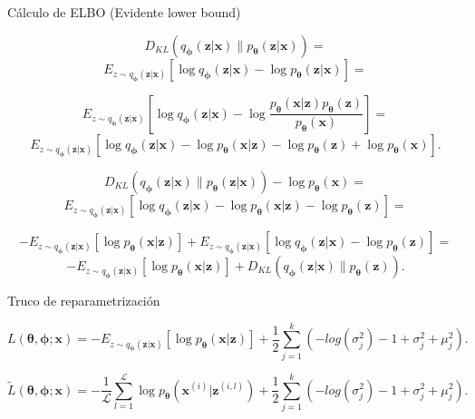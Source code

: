 \documentclass[spanish]{beamer}
\begin{document}
\begin{frame}{Cálculo de ELBO (Evidente lower bound)}

$$D_{KL}(q_{\boldsymbol{\phi}}(\textbf{z}|\textbf{x}) \parallel p_{\boldsymbol{\theta}}(\textbf{z}|\textbf{x})) =$$ $$ E_{z \sim q_{\boldsymbol{\phi}} (\textbf{z}|\textbf{x})} \left[ \log q_{\boldsymbol{\phi}}(\textbf{z}|\textbf{x}) - \log p_{\boldsymbol{\theta}}(\textbf{z}|\textbf{x}) \right] =$$

\pause
$$E_{z \sim q_{\boldsymbol{\phi}} (\textbf{z}|\textbf{x})} \left[ \log q_{\boldsymbol{\phi}}(\textbf{z}|\textbf{x}) - \log  \frac{p_{\boldsymbol{\theta}}(\textbf{x}|\textbf{z})p_{\boldsymbol{\theta}}(\textbf{z})}{p_{\boldsymbol{\theta}}(\textbf{x})}\right]=$$ $$ E_{z \sim q_{\boldsymbol{\phi}} (\textbf{z}|\textbf{x})} \left[ \log q_{\boldsymbol{\phi}}(\textbf{z}|\textbf{x}) - \log  p_{\boldsymbol{\theta}}(\textbf{x}|\textbf{z}) - \log p_{\boldsymbol{\theta}}(\textbf{z}) + \log p_{\boldsymbol{\theta}}(\textbf{x})\right].$$

\pause
$$ D_{KL}(q_{\boldsymbol{\phi}}(\textbf{z}|\textbf{x}) \parallel p_{\boldsymbol{\theta}}(\textbf{z}|\textbf{x})) - \log p_{\boldsymbol{\theta}}(\textbf{x}) =$$ $$ E_{z \sim q_{\boldsymbol{\phi}} (\textbf{z}|\textbf{x})} \left[ \log q_{\boldsymbol{\phi}}(\textbf{z}|\textbf{x}) - \log  p_{\boldsymbol{\theta}}(\textbf{x}|\textbf{z}) - \log p_{\boldsymbol{\theta}}(\textbf{z})\right] = $$

\pause
$$ - E_{z \sim q_{\boldsymbol{\phi}} (\textbf{z}|\textbf{x})} \left[ \log p_{\boldsymbol{\theta}}(\textbf{x}|\textbf{z}) \right] + E_{z \sim q_{\boldsymbol{\phi}} (\textbf{z}|\textbf{x})} \left[ \log  q_{\boldsymbol{\phi}}(\textbf{z}|\textbf{x}) - \log p_{\boldsymbol{\theta}}(\textbf{z})\right]=$$ $$ - E_{z \sim q_{\boldsymbol{\phi}} (\textbf{z}|\textbf{x})} \left[ \log p_{\boldsymbol{\theta}}(\textbf{x}|\textbf{z}) \right] + D_{KL}(q_{\boldsymbol{\phi}}(\textbf{z}|\textbf{x}) \parallel p_{\boldsymbol{\theta}}(\textbf{z})).$$

\end{frame}

\begin{frame}{Truco de reparametrización}

$$L(\boldsymbol{\theta}, \boldsymbol{\phi}; \textbf{x}) = - E_{z \sim q_{\boldsymbol{\phi}} (\textbf{z}|\textbf{x})} \left[ \log p_{\boldsymbol{\theta}}(\textbf{x}|\textbf{z}) \right] +  \frac{1}{2}\sum_{j=1}^k \left( -log(\sigma_j^2) -1 + \sigma_j^2 + \mu_j^2 \right). $$

$$\tilde{L}(\boldsymbol{\theta}, \boldsymbol{\phi}; \textbf{x}) = -\frac{1}{\mathcal{L}}\sum_{l=1}^{\mathcal{L}}\log p_{\boldsymbol{\theta}}(\textbf{x}^{(i)}|\textbf{z}^{(i,l)}) +  \frac{1}{2}\sum_{j=1}^k \left( -log(\sigma_j^2) -1 + \sigma_j^2 + \mu_j^2 \right).$$

\end{frame}
\end{document}
